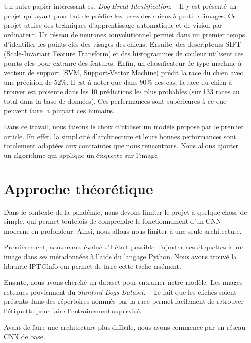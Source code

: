\documentclass{article}
\begin{document}
Un autre papier intéressant est \textit{Dog Breed Identification}. ~\cite{output} Il y est présenté un projet qui ayant pour but de prédire les races des chiens à partir d’images. Ce projet utilise des techniques d’apprentissage automatique et de vision par ordinateur. Un réseau de neurones convolutionnel permet dans un premier temps d’identifier les points clés des visages des chiens. Ensuite, des descripteurs SIFT (Scale-Invariant Feature Transform) et des histogrammes de couleur utilisent ces points clés pour extraire des features. Enfin, un classificateur de type machine à vecteur de support (SVM, Support-Vector Machine) prédit la race du chien avec une précision de 52\%. Il est à noter que dans 90\% des cas, la race du chien à trouver est présente dans les 10 prédictions les plus probables (sur 133 races au total dans la base de données). Ces performances sont supérieures à ce que peuvent faire la plupart des humains.

Dans ce travail, nous faisons le choix d'utiliser un modèle proposé par le premier article. En effet, la simplicité d’architecture et leurs bonnes performances sont totalement adaptées aux contraintes que nous rencontrons. Nous allons ajouter un algorithme qui applique un étiquette sur l'image.

\section{Approche théorétique}
Dans le contexte de la pandémie, nous devons limiter le projet à quelque chose de simple, qui permet toutefois de comprendre le fonctionnement d'un CNN moderne en profondeur. Ainsi, nous allons nous limiter à une seule architecture.

Premièrement, nous avons évalué s'il était possible d'ajouter des étiquettes à une
image dans ses métadonnées à l'aide du langage Python. Nous avons trouvé la librairie IPTCInfo qui permet de faire cette tâche aisément.

Ensuite, nous avons cherché un dataset pour entrainer notre modèle. Les images retenues proviennent du \textit{Stanford Dogs Dataset}. ~\cite{KhoslaYaoJayadevaprakashFeiFei_FGVC2011} Le fait que les clichés soient
présents dans des répertoires nommés par la race permet facilement de retrouver l'étiquette pour faire l'entrainement supervisé.

Avant de faire une architecture plus difficile, nous avons commencé par un réseau CNN de base.
\end{document}
